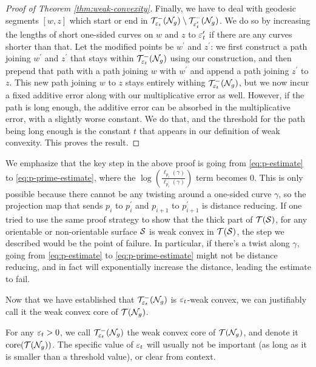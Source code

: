 \documentclass[12pt, reqno]{amsart}
\begin{document}
\begin{proof}[Proof of Theorem \ref{thm:weak-convexity}]
  Finally, we have to deal with geodesic segments $[w,z]$ which start or end in $\mathcal{T}_{\varepsilon_t}^{-}(\mathcal{N}_g) \setminus \mathcal{T}_{\varepsilon_t^{\prime}}^{-}(\mathcal{N}_g)$.
  We do so by increasing the lengths of short one-sided curves on $w$ and $z$ to $\varepsilon_t^{\prime}$ if there are any curves shorter than that.
  Let the modified points be $w^{\prime}$ and $z^{\prime}$: we first construct a path joining $w^{\prime}$ and $z^{\prime}$ that stays within $\mathcal{T}_{\varepsilon_t}^{-}(\mathcal{N}_g)$ using our construction, and then prepend that path with a path joining $w$ with $w^{\prime}$ and append a path joining $z^{\prime}$ to $z$.
  This new path joining $w$ to $z$ stays entirely withing $\mathcal{T}_{\varepsilon_t}^{-}(\mathcal{N}_g)$, but we now incur a fixed additive error along with our multiplicative error as well.
  However, if the path is long enough, the additive error can be absorbed in the multiplicative error, with a slightly worse constant.
  We do that, and the threshold for the path being long enough is the constant $t$ that appears in our definition of weak convexity.
  This proves the result.
\end{proof}

\begin{rem}
  We emphasize that the key step in the above proof is going from \eqref{eq:p-estimate} to \eqref{eq:p-prime-estimate}, where the $\log\left( \frac{\ell_{p_i}(\gamma)}{\ell_{p_i^{\prime}}(\gamma)}  \right)$ term becomes $0$.
  This is only possible because there cannot be any twisting around a one-sided curve $\gamma$, so the projection map that sends $p_i$ to $p_i^{\prime}$ and $p_{i+1}$ to $p_{i+1}^{\prime}$ is distance reducing.
  If one tried to use the same proof strategy to show that the thick part of $\mathcal{T}(\mathcal{S})$, for any orientable or non-orientable surface $\mathcal{S}$ is weak convex in $\mathcal{T}(\mathcal{S})$, the step we described would be the point of failure.
  In particular, if there's a twist along $\gamma$, going from \eqref{eq:p-estimate} to \eqref{eq:p-prime-estimate} might not be distance reducing, and in fact will exponentially increase the distance, leading the estimate to fail.
\end{rem}

Now that we have established that $\mathcal{T}_{\varepsilon_t}^{-}(\mathcal{N}_g)$ is $\varepsilon_t$-weak convex, we can justifiably call it the weak convex core of $\mathcal{T}(\mathcal{N}_g)$.

\begin{definition}
  For any $\varepsilon_t > 0$, we call $\mathcal{T}_{\varepsilon_t}^{-}(\mathcal{N}_g)$ the weak convex core of $\mathcal{T}(\mathcal{N}_g)$, and denote it $\mathrm{core}(\mathcal{T}(\mathcal{N}_g))$.
  The specific value of $\varepsilon_t$ will usually not be important (as long as it is smaller than a threshold value), or clear from context.
\end{definition}
\end{document}
